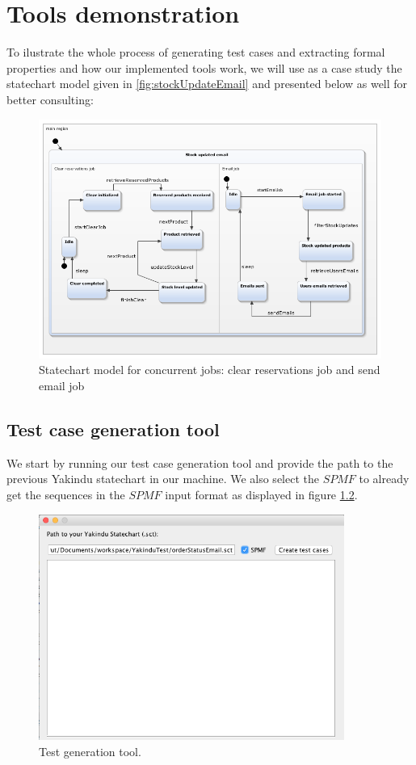 \chapter{Tools demonstration}
\label{cap:casestudy}

To ilustrate the whole process of generating test cases and extracting formal properties and how our implemented tools work, we will use as a case study the statechart model given in \ref{fig:stockUpdateEmail} and presented below as well for better consulting:

\begin{figure}[h]
\centering
\includegraphics[width=15cm]{figuras/stockUpdateEmail}
\caption{\label{fig:stockUpdateEmail_2} Statechart model for concurrent jobs: clear reservations job and send email job}
\end{figure}

\section{Test case generation tool}

We start by running our test case generation tool and provide the path to the previous Yakindu statechart in our machine. We also select the $SPMF$ to already get the sequences in the $SPMF$ input format as displayed in figure \ref{fig:testGenTool_1}.

\begin{figure}[htb]
\centering
\includegraphics[width=10cm]{figuras/testGenTool_1}
\caption{\label{fig:testGenTool_1} Test generation tool.}
\end{figure}

